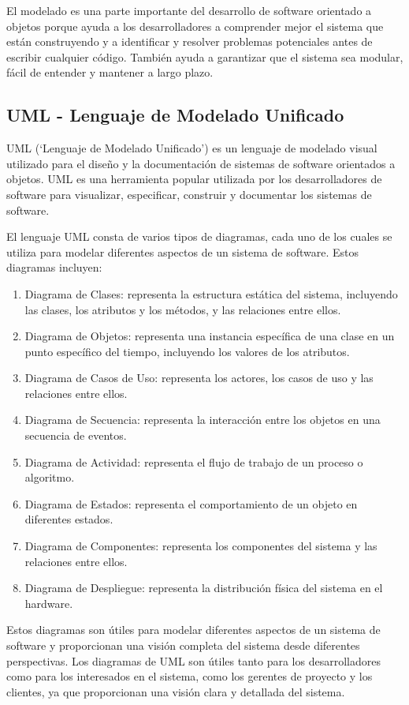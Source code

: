\documentclass[executivepaper]{article}
\begin{document}
El modelado es una parte importante del desarrollo de software orientado a objetos porque ayuda a los desarrolladores a comprender mejor el sistema que están construyendo y a identificar y resolver problemas potenciales antes de escribir cualquier código. También ayuda a garantizar que el sistema sea modular, fácil de entender y mantener a largo plazo.

\subsection*{UML - Lenguaje de Modelado Unificado}

UML (\enquote*{Lenguaje de Modelado Unificado}) es un lenguaje de modelado visual utilizado para el diseño y la documentación de sistemas de software orientados a objetos. UML es una herramienta popular utilizada por los desarrolladores de software para visualizar, especificar, construir y documentar los sistemas de software.

El lenguaje UML consta de varios tipos de diagramas, cada uno de los cuales se utiliza para modelar diferentes aspectos de un sistema de software. Estos diagramas incluyen:

\begin{enumerate}
\item Diagrama de Clases: representa la estructura estática del sistema, incluyendo las clases, los atributos y los métodos, y las relaciones entre ellos.
\item Diagrama de Objetos: representa una instancia específica de una clase en un punto específico del tiempo, incluyendo los valores de los atributos.
\item Diagrama de Casos de Uso: representa los actores, los casos de uso y las relaciones entre ellos.
\item Diagrama de Secuencia: representa la interacción entre los objetos en una secuencia de eventos.
\item Diagrama de Actividad: representa el flujo de trabajo de un proceso o algoritmo.
\item Diagrama de Estados: representa el comportamiento de un objeto en diferentes estados.
\item Diagrama de Componentes: representa los componentes del sistema y las relaciones entre ellos.
\item Diagrama de Despliegue: representa la distribución física del sistema en el hardware.
\end{enumerate}

Estos diagramas son útiles para modelar diferentes aspectos de un sistema de software y proporcionan una visión completa del sistema desde diferentes perspectivas. Los diagramas de UML son útiles tanto para los desarrolladores como para los interesados en el sistema, como los gerentes de proyecto y los clientes, ya que proporcionan una visión clara y detallada del sistema.
\end{document}
